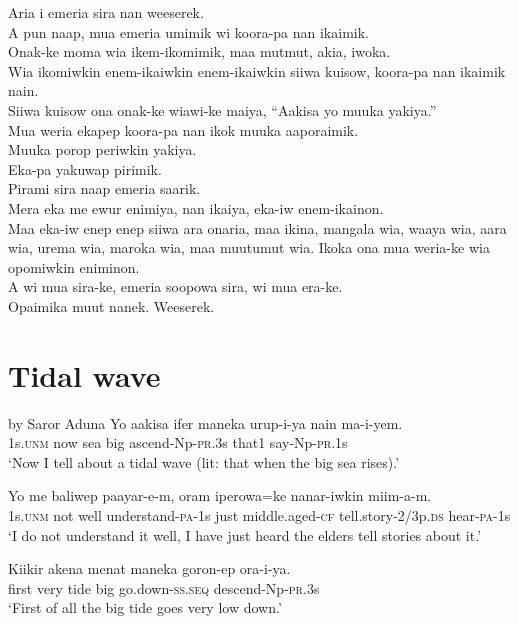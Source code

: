 Aria i emeria sira nan weeserek. \\
A pun naap, mua emeria umimik wi koora-pa nan ikaimik. \\
Onak-ke moma wia ikem-ikomimik, maa mutmut, akia, iwoka. \\
Wia ikomiwkin enem-ikaiwkin enem-ikaiwkin siiwa kuisow, koora-pa nan ikaimik nain. \\
Siiwa kuisow ona onak-ke wiawi-ke maiya, “Aakisa yo muuka yakiya.” \\
Mua weria ekapep koora-pa nan ikok muuka aaporaimik. \\
Muuka porop periwkin yakiya. \\
Eka-pa yakuwap pirimik. \\
Pirami sira naap emeria saarik. \\
Mera eka me ewur enimiya, nan ikaiya, eka-iw enem-ikainon. \\
\textrm{Maa eka-iw enep enep siiwa ara onaria, maa ikina, mangala wia, waaya wia, aara wia, urema wia, maroka wia, maa muutumut wia.}
Ikoka ona mua weria-ke wia opomiwkin eniminon. \\
A wi mua sira-ke, emeria soopowa sira, wi mua era-ke. \\
\textrm{Opaimika muut nanek. }
Weeserek. \\
\setcounter{equation}{0}
\section{ Tidal wave}
 by Saror Aduna
\ea\label{ex:a:x1}
\gll  Yo  aakisa  ifer  maneka  urup-i-ya  nain  ma-i-yem. \\
1s.\textsc{unm}  now  sea  big  ascend-Np-\textsc{pr}.3s  that1  say-Np-\textsc{pr}.1s \\
\glt ‘Now I tell about a tidal wave (lit: that when the big sea rises).’ \\
\z


\ea\label{ex:a:x2}
\gll  Yo  me  baliwep  paayar-e-m,  oram  iperowa=ke      nanar-iwkin  miim-a-m. \\
1s.\textsc{unm}  not  well  understand-\textsc{pa}-1s  just  middle.aged-\textsc{cf} tell.story-2/3p.\textsc{ds}  hear-\textsc{pa}-1s \\


\glt ‘I do not understand it well, I have just heard the elders tell stories about it.’ \\
\z


\ea\label{ex:a:x3}
\gll  Kiikir  akena  menat  maneka  goron-ep  ora-i-ya. \\
first  very  tide  big  go.down-\textsc{ss.seq}  descend-Np-\textsc{pr}.3s \\
\glt ‘First of all the big tide goes very low down.’ \\
\z


